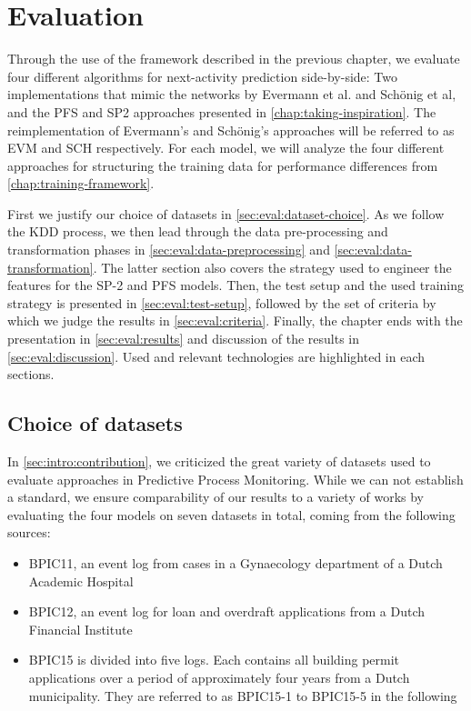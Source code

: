 \chapter{Evaluation}\label{chap:evaluation}
Through the use of the framework described in the previous chapter, we evaluate four different algorithms for next-activity prediction side-by-side: Two implementations that mimic the networks by Evermann et al. and Schönig et al, and the PFS and SP2 approaches presented in \autoref{chap:taking-inspiration}. The reimplementation of Evermann's and Schönig's approaches will be referred to as EVM and SCH respectively. For each model, we will analyze the four different approaches for structuring the training data for performance differences from \autoref{chap:training-framework}.

First we justify our choice of datasets in \autoref{sec:eval:dataset-choice}. As we follow the KDD process, we then lead through the data pre-processing and transformation phases in \autoref{sec:eval:data-preprocessing} and \autoref{sec:eval:data-transformation}. The latter section also covers the strategy used to engineer the features for the SP-2 and PFS models.
Then, the test setup and the used training strategy is presented in \autoref{sec:eval:test-setup}, followed by the set of criteria by which we judge the results in \autoref{sec:eval:criteria}. Finally, the chapter ends with the presentation in \autoref{sec:eval:results} and discussion of the results in \autoref{sec:eval:discussion}. Used and relevant technologies are highlighted in each sections.

\section{Choice of datasets}
\label{sec:eval:dataset-choice}
In \autoref{sec:intro:contribution}, we criticized the great variety of datasets used to evaluate approaches in Predictive Process Monitoring. While we can not establish a standard, we ensure comparability of our results to a variety of works by evaluating the four models on seven datasets in total, coming from the following sources:

\begin{itemize}
    \item BPIC11, an event log from cases in a Gynaecology department of a Dutch Academic Hospital~\cite{BPIC2011}
    \item BPIC12, an event log for loan and overdraft applications from a Dutch Financial Institute~\cite{BPIC2012}
    \item BPIC15 is divided into five logs. Each contains all building permit applications over a period of approximately four years from a Dutch municipality. They are referred to as BPIC15-1 to BPIC15-5 in the following~\cite{BPIC2015}
\end{itemize}

